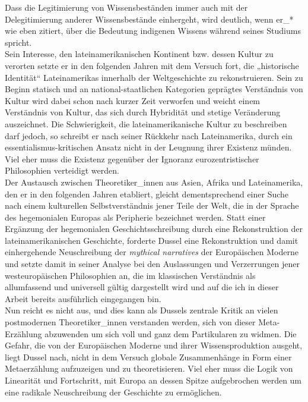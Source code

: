 \noindent Dass die Legitimierung von Wissensbeständen immer
auch mit der Delegitimierung anderer Wissensbestände einhergeht, wird deutlich,
wenn er\_* wie eben zitiert, über die Bedeutung indigenen Wissens während seines
Studiums spricht.\\
Sein Interesse, den lateinamerikanischen Kontinent bzw. dessen Kultur zu
verorten setzte er in den folgenden Jahren mit dem Versuch fort, die
„historische Identität“\footnotemark {} Lateinamerikas innerhalb der Weltgeschichte zu
rekonstruieren. Sein zu Beginn statisch und an national-staatlichen Kategorien
geprägtes Verständnis von Kultur wird dabei schon nach kurzer Zeit verworfen und
weicht einem Verständnis von Kultur, das sich durch Hybridität und stetige
Veränderung auszeichnet. Die Schwierigkeit, die lateinamerikanische Kultur zu
beschreiben darf jedoch, so schreibt er nach seiner Rückkehr nach Lateinamerika,
durch ein essentialismus-kritischen Ansatz nicht in der Leugnung ihrer Existenz
münden. Viel eher muss die Existenz gegenüber der Ignoranz eurozentristischer
Philosophien verteidigt werden.\\

 \noindent Der Austausch zwischen Theoretiker\_innen aus
Asien, Afrika und Lateinamerika, den er in den folgenden Jahren etabliert,
gleicht dementsprechend einer Suche nach einem kulturellen Selbstverständnis
jener Teile der Welt, die in der Sprache des hegemonialen Europas als Peripherie
bezeichnet werden. Statt einer Ergänzung der hegemonialen Geschichtsschreibung
durch eine Rekonstruktion der lateinamerikanischen Geschichte, forderte Dussel
eine Rekonstruktion und damit einhergehende Neuschreibung der \textit{mythical
narratives} der Europäischen Moderne und setzte damit in seiner Analyse bei den
Auslassungen und Verzerrungen jener westeuropäischen Philosophien an, die im
klassischen Verständnis als allumfassend und universell gültig dargestellt wird
und auf die ich in dieser Arbeit bereits ausführlich eingegangen
bin.\footnotemark {}\\

\noindent Nun reicht es nicht aus, und dies kann als Dussels zentrale Kritik an vielen
postmodernen Theoretiker\_innen verstanden werden, sich von dieser Meta-Erzählung
abzuwenden um sich voll und ganz dem Partikularen zu widmen. Die Gefahr, die von
der Europäischen Moderne und ihrer Wissensproduktion ausgeht, liegt Dussel nach,
nicht in dem Versuch globale Zusammenhänge in Form einer Metaerzählung
aufzuzeigen und zu theoretisieren. Viel eher muss die Logik von Linearität und
Fortschritt, mit Europa an dessen Spitze aufgebrochen werden um eine radikale
Neuschreibung der Geschichte zu ermöglichen.\\

